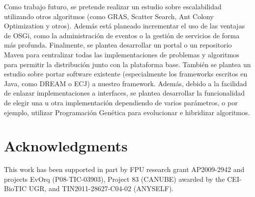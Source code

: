 \documentclass[runningheads]{llncs}
\begin{document}
Como trabajo futuro, se pretende realizar un estudio sobre escalabilidad utilizando otros algoritmos (como GRAS, Scatter Search, Ant Colony Optimization y otros). Además está planeado incrementar el uso de las ventajas de OSGi, como la administración de eventos o la gestión de servicios de forma más profunda. Finalmente, se plantea desarrollar un portal o un repositorio Maven para centralizar todas las implementaciones de problemas y algoritmos para permitir la distribución junto con la plataforma base. También se plantea un estudio sobre portar software existente (especialmente los frameworks escritos en Java, como DREAM o ECJ) a nuestro framework. Además, debido a la facilidad de enlazar implementaciones a interfaces, se plantea desarrollar la funcionalidad de elegir una u otra implementación dependiendo de varios parámetros, o por ejemplo, utilizar Programación Genética para evolucionar e hibridizar algoritmos.

\section{Acknowledgments}
This work has been supported in part by FPU research grant AP2009-2942 and projects EvOrq (P08-TIC-03903), Project 83 (CANUBE) awarded by the CEI-BioTIC UGR, and TIN2011-28627-C04-02 (ANYSELF).






\end{document}
